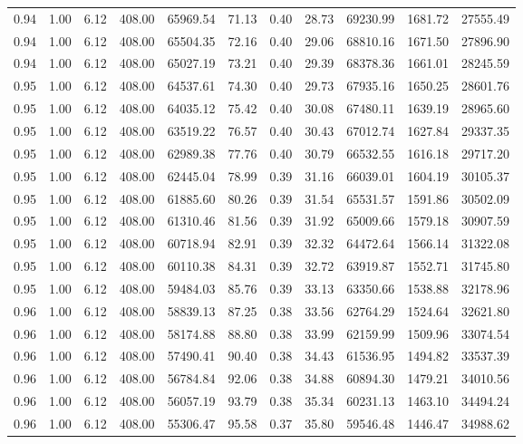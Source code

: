 \begin{table}[!ht]
\begin{tabular}{rrrrrrrrrrr}
0.94 & 1.00 & 6.12 & 408.00 & 65969.54 & 71.13 & 0.40 & 28.73 & 69230.99 & 1681.72 & 27555.49 \\
0.94 & 1.00 & 6.12 & 408.00 & 65504.35 & 72.16 & 0.40 & 29.06 & 68810.16 & 1671.50 & 27896.90 \\
0.94 & 1.00 & 6.12 & 408.00 & 65027.19 & 73.21 & 0.40 & 29.39 & 68378.36 & 1661.01 & 28245.59 \\
0.95 & 1.00 & 6.12 & 408.00 & 64537.61 & 74.30 & 0.40 & 29.73 & 67935.16 & 1650.25 & 28601.76 \\
0.95 & 1.00 & 6.12 & 408.00 & 64035.12 & 75.42 & 0.40 & 30.08 & 67480.11 & 1639.19 & 28965.60 \\
0.95 & 1.00 & 6.12 & 408.00 & 63519.22 & 76.57 & 0.40 & 30.43 & 67012.74 & 1627.84 & 29337.35 \\
0.95 & 1.00 & 6.12 & 408.00 & 62989.38 & 77.76 & 0.40 & 30.79 & 66532.55 & 1616.18 & 29717.20 \\
0.95 & 1.00 & 6.12 & 408.00 & 62445.04 & 78.99 & 0.39 & 31.16 & 66039.01 & 1604.19 & 30105.37 \\
0.95 & 1.00 & 6.12 & 408.00 & 61885.60 & 80.26 & 0.39 & 31.54 & 65531.57 & 1591.86 & 30502.09 \\
0.95 & 1.00 & 6.12 & 408.00 & 61310.46 & 81.56 & 0.39 & 31.92 & 65009.66 & 1579.18 & 30907.59 \\
0.95 & 1.00 & 6.12 & 408.00 & 60718.94 & 82.91 & 0.39 & 32.32 & 64472.64 & 1566.14 & 31322.08 \\
0.95 & 1.00 & 6.12 & 408.00 & 60110.38 & 84.31 & 0.39 & 32.72 & 63919.87 & 1552.71 & 31745.80 \\
0.95 & 1.00 & 6.12 & 408.00 & 59484.03 & 85.76 & 0.39 & 33.13 & 63350.66 & 1538.88 & 32178.96 \\
0.96 & 1.00 & 6.12 & 408.00 & 58839.13 & 87.25 & 0.38 & 33.56 & 62764.29 & 1524.64 & 32621.80 \\
0.96 & 1.00 & 6.12 & 408.00 & 58174.88 & 88.80 & 0.38 & 33.99 & 62159.99 & 1509.96 & 33074.54 \\
0.96 & 1.00 & 6.12 & 408.00 & 57490.41 & 90.40 & 0.38 & 34.43 & 61536.95 & 1494.82 & 33537.39 \\
0.96 & 1.00 & 6.12 & 408.00 & 56784.84 & 92.06 & 0.38 & 34.88 & 60894.30 & 1479.21 & 34010.56 \\
0.96 & 1.00 & 6.12 & 408.00 & 56057.19 & 93.79 & 0.38 & 35.34 & 60231.13 & 1463.10 & 34494.24 \\
0.96 & 1.00 & 6.12 & 408.00 & 55306.47 & 95.58 & 0.37 & 35.80 & 59546.48 & 1446.47 & 34988.62 \\

\end{tabular}
\end{table}
